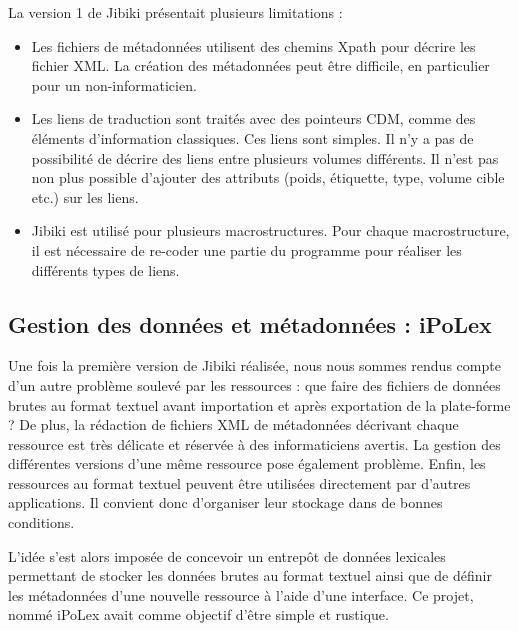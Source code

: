 \documentclass[10pt,a4paper,twoside]{article}
\begin{document}
La version 1 de Jibiki présentait plusieurs limitations :
\begin{itemize}
\item Les fichiers de métadonnées utilisent des chemins Xpath pour décrire les fichier XML. La création des métadonnées peut être difficile, en particulier pour un non-informaticien.
\item Les liens de traduction sont traités avec des pointeurs CDM, comme des éléments d'information classiques. Ces liens sont simples. Il n'y a pas de possibilité de décrire des liens entre plusieurs volumes différents. Il n'est pas non plus possible d'ajouter des attributs (poids, étiquette, type, volume cible etc.) sur les liens. 
\item Jibiki est utilisé pour plusieurs macrostructures. Pour chaque macrostructure, il est nécessaire de re-coder une partie du programme pour réaliser les différents types de liens.
\end{itemize}


\cite{MMAC06}

\subsection{Gestion des données et métadonnées : iPoLex}


Une fois la première version de Jibiki réalisée, nous nous sommes rendus compte d'un autre problème soulevé par les ressources : que faire des fichiers de données brutes au format textuel avant importation et après exportation de la plate-forme ? 
De plus, la rédaction de fichiers XML de métadonnées décrivant chaque ressource est très délicate et réservée à des informaticiens avertis.
La gestion des différentes versions d'une même ressource pose également problème.
Enfin, les ressources au format textuel peuvent être utilisées directement par d'autres applications. Il convient donc d'organiser leur stockage dans de bonnes conditions.

L'idée s'est alors imposée de concevoir un entrepôt de données lexicales permettant de stocker les données brutes au format textuel ainsi que de définir les métadonnées d'une nouvelle ressource à l'aide d'une interface. Ce projet, nommé iPoLex avait comme objectif d'être simple et rustique.
\end{document}
